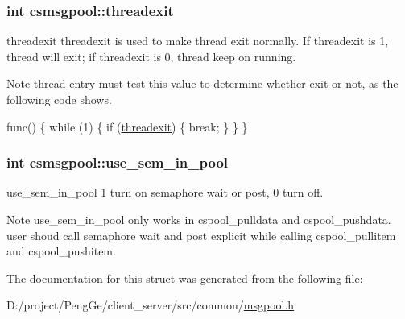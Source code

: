 \subsubsection[{threadexit}]{\setlength{\rightskip}{0pt plus 5cm}int csmsgpool\+::threadexit}\label{structcsmsgpool_a7d814c8195e4baacad1f4045c8e63ad8}


threadexit threadexit is used to make thread exit normally. If threadexit is 1, thread will exit; if threadexit is 0, thread keep on running. 

\begin{DoxyNote}{Note}
thread entry must test this value to determine whether exit or not, as the following code shows.
\end{DoxyNote}

\begin{DoxyCode}
func()
\{
    \textcolor{keywordflow}{while} (1) \{
        \textcolor{keywordflow}{if} (\hyperlink{structcsmsgpool_a7d814c8195e4baacad1f4045c8e63ad8}{threadexit}) \{
            \textcolor{keywordflow}{break};
        \}
    \}
\}
\end{DoxyCode}
 \hypertarget{structcsmsgpool_ab79b44d003c02515c83d5772eb53c937}{}
\subsubsection[{use\+\_\+sem\+\_\+in\+\_\+pool}]{\setlength{\rightskip}{0pt plus 5cm}int csmsgpool\+::use\+\_\+sem\+\_\+in\+\_\+pool}\label{structcsmsgpool_ab79b44d003c02515c83d5772eb53c937}


use\+\_\+sem\+\_\+in\+\_\+pool 1 turn on semaphore wait or post, 0 turn off. 

\begin{DoxyNote}{Note}
use\+\_\+sem\+\_\+in\+\_\+pool only works in cspool\+\_\+pulldata and cspool\+\_\+pushdata. user shoud call semaphore wait and post explicit while calling cspool\+\_\+pullitem and cspool\+\_\+pushitem. 
\end{DoxyNote}


The documentation for this struct was generated from the following file\+:\begin{DoxyCompactItemize}
\item 
D\+:/project/\+Peng\+Ge/client\+\_\+server/src/common/\hyperlink{msgpool_8h}{msgpool.\+h}\end{DoxyCompactItemize}
